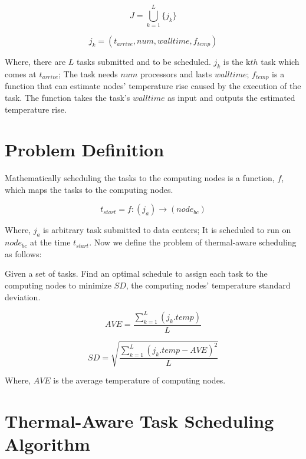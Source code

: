 \begin{equation}
J=\bigcup_{k=1}^{L} \{j_k\}
\end{equation}

\begin{equation}
j_k=(t_{arrive}, num, walltime, f_{temp})
\end{equation}

Where, there are $L$ tasks submitted and to be scheduled. $j_k$ is the k$th$ task which comes 
at $t_{arrive}$; The task needs $num$ processors and lasts $walltime$; $f_{temp}$ is a function that can estimate nodes' temperature rise caused by the execution of the task. The function takes the task's $walltime$ as input and outputs the estimated temperature rise. 

\section{Problem Definition}\label{S:problem}

Mathematically scheduling the tasks to the computing nodes is a function, $f$, which maps the tasks to the computing nodes.

\begin{equation}
t_{start}=f:(j_a) \rightarrow (node_{bc}) 
\end{equation}

Where, $j_a$ is arbitrary task submitted to data centers; It is scheduled to run on $node_{bc}$ at the time $t_{start}$. Now we define the problem of thermal-aware scheduling as follows: 

Given a set of tasks. Find an optimal schedule to assign each task to the computing nodes to minimize $SD$, the computing nodes' temperature standard deviation.

\begin{equation}
AVE=\frac{\sum_{k=1}^{L} (j_k.temp)}{L}
\end{equation}

\begin{equation}
SD=\sqrt{\frac{\sum_{k=1}^{L} (j_k.temp-AVE)^2}{L}}
\end{equation}

Where, $AVE$ is the average temperature of computing nodes.
\section{Thermal-Aware Task Scheduling Algorithm}\label{S:algorithm}

